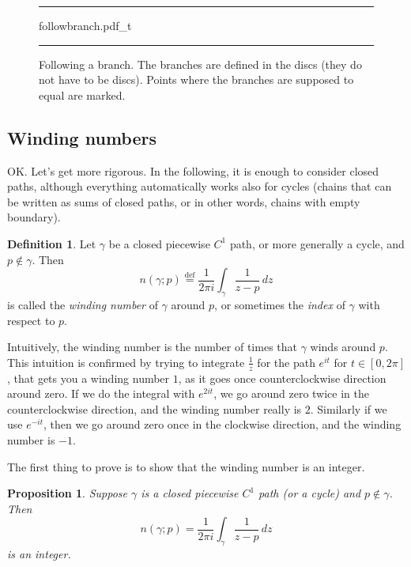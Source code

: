 \documentclass[12pt,openany]{book}
\newcommand{\myindex}[1]{#1\index{#1}}
\theoremstyle{plain}
\newtheorem{prop}[thm]{Proposition}
\theoremstyle{remark}
\theoremstyle{definition}
\newtheorem{defn}[thm]{Definition}
\newenvironment{myfig}{%
\begin{figure}[h!t]
\noindent\rule{\textwidth}{0.4pt}\vspace{12pt}\par\centering}%
{\par\noindent\rule{\textwidth}{0.4pt}
\end{figure}}
\theoremstyle{exercise}
\theoremstyle{example}
\begin{document}
\begin{myfig}
{followbranch.pdf_t}
\caption{Following a branch.
The branches are defined in the discs
(they do not have to be discs).
Points where the branches are supposed to equal
are marked.\label{fig:followbranch}}
\end{myfig}

\subsection{Winding numbers}

OK.  Let's get more rigorous.  In the following, it is enough
to consider closed paths, although everything automatically works
also for cycles (chains that can be written as sums of closed paths,
or in other words, chains with empty boundary).

\begin{defn}
Let $\gamma$ be a closed piecewise $C^1$ path, or more generally a cycle,
and $p \notin \gamma$.  Then
\begin{equation*}
n(\gamma;p)
\overset{\text{def}}{=}
\frac{1}{2\pi i} \int_\gamma \frac{1}{z-p} \, dz
\end{equation*}
is called the
\emph{\myindex{winding number}} of $\gamma$ around $p$, or
sometimes the 
\emph{\myindex{index}} of $\gamma$ with respect to $p$.
\end{defn}

Intuitively, the winding number is the number of times that $\gamma$ winds
around $p$.  This intuition is confirmed by trying to integrate
$\frac{1}{z}$ for the path $e^{it}$ for $t \in [0,2\pi]$, that gets you 
a winding number $1$, as it goes once counterclockwise direction around zero.  If we do
the integral with $e^{2it}$, we go around zero twice in the
counterclockwise direction, and the winding number really is $2$.  Similarly
if we use $e^{-it}$, then we go around zero once in the
clockwise direction, and the winding number is $-1$.

The first thing to prove is to show that the winding number is an integer.

\begin{prop}
Suppose $\gamma$ is a closed piecewise $C^1$ path (or a cycle)
and $p \notin \gamma$.  Then
\begin{equation*}
n(\gamma;p) = \frac{1}{2\pi i} \int_\gamma \frac{1}{z-p} \, dz
\end{equation*}
is an integer.
\end{prop}
\end{document}
